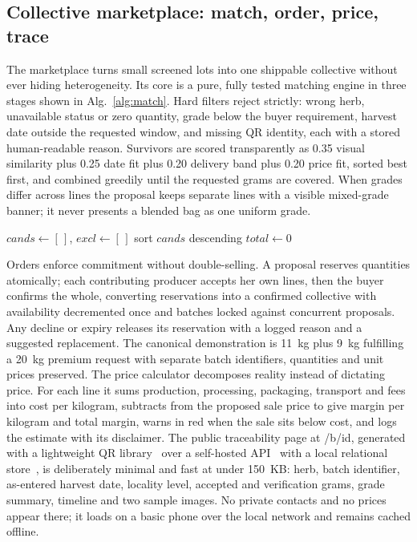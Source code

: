 \documentclass[10pt,conference,a4paper]{IEEEtran}
\begin{document}
\subsection{Collective marketplace: match, order, price, trace}
The marketplace turns small screened lots into one shippable collective without ever hiding heterogeneity. Its core is a pure, fully tested matching engine in three stages shown in Alg.~\ref{alg:match}. Hard filters reject strictly: wrong herb, unavailable status or zero quantity, grade below the buyer requirement, harvest date outside the requested window, and missing QR identity, each with a stored human-readable reason. Survivors are scored transparently as 0.35 visual similarity plus 0.25 date fit plus 0.20 delivery band plus 0.20 price fit, sorted best first, and combined greedily until the requested grams are covered. When grades differ across lines the proposal keeps separate lines with a visible mixed-grade banner; it never presents a blended bag as one uniform grade.
\begin{algorithm}[htbp]
\caption{Hard-filter, rank, combine with explanations.}
\label{alg:match}
$cands\gets[\,]$, $excl\gets[\,]$
sort $cands$ descending\; $total\gets0$
\end{algorithm}
Orders enforce commitment without double-selling. A proposal reserves quantities atomically; each contributing producer accepts her own lines, then the buyer confirms the whole, converting reservations into a confirmed collective with availability decremented once and batches locked against concurrent proposals. Any decline or expiry releases its reservation with a logged reason and a suggested replacement. The canonical demonstration is 11~kg plus 9~kg fulfilling a 20~kg premium request with separate batch identifiers, quantities and unit prices preserved.
The price calculator decomposes reality instead of dictating price. For each line it sums production, processing, packaging, transport and fees into cost per kilogram, subtracts from the proposed sale price to give margin per kilogram and total margin, warns in red when the sale sits below cost, and logs the estimate with its disclaimer. The public traceability page at /b/id, generated with a lightweight QR library~\cite{segno} over a self-hosted API~\cite{fastapi} with a local relational store~\cite{sqlalchemy}, is deliberately minimal and fast at under 150~KB: herb, batch identifier, as-entered harvest date, locality level, accepted and verification grams, grade summary, timeline and two sample images. No private contacts and no prices appear there; it loads on a basic phone over the local network and remains cached offline.
\end{document}
